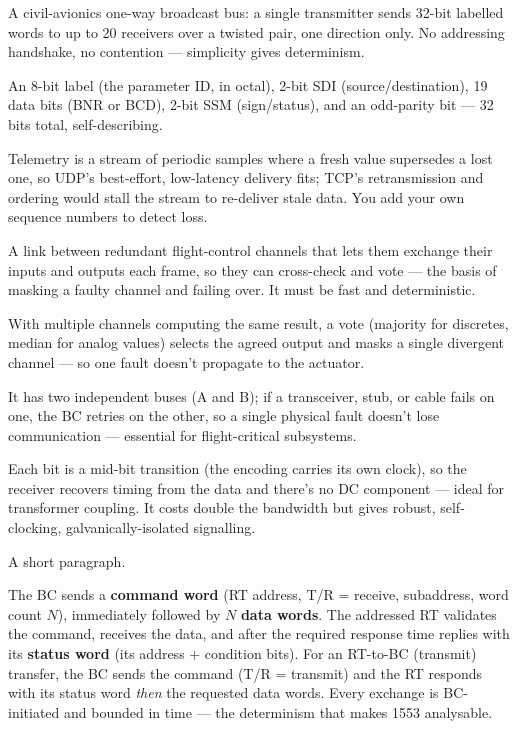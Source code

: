 A civil-avionics one-way broadcast bus: a single transmitter sends 32-bit
labelled words to up to 20 receivers over a twisted pair, one direction only.
No addressing handshake, no contention --- simplicity gives determinism.

An 8-bit label (the parameter ID, in octal), 2-bit SDI (source/destination),
19 data bits (BNR or BCD), 2-bit SSM (sign/status), and an odd-parity bit ---
32 bits total, self-describing.

Telemetry is a stream of periodic samples where a fresh value supersedes a lost
one, so UDP's best-effort, low-latency delivery fits; TCP's retransmission and
ordering would stall the stream to re-deliver stale data. You add your own
sequence numbers to detect loss.

A link between redundant flight-control channels that lets them exchange their
inputs and outputs each frame, so they can cross-check and vote --- the basis of
masking a faulty channel and failing over. It must be fast and deterministic.

With multiple channels computing the same result, a vote (majority for
discretes, median for analog values) selects the agreed output and masks a
single divergent channel --- so one fault doesn't propagate to the actuator.

It has two independent buses (A and B); if a transceiver, stub, or cable fails
on one, the BC retries on the other, so a single physical fault doesn't lose
communication --- essential for flight-critical subsystems.

Each bit is a mid-bit transition (the encoding carries its own clock), so the
receiver recovers timing from the data and there's no DC component --- ideal for
transformer coupling. It costs double the bandwidth but gives robust,
self-clocking, galvanically-isolated signalling.

%
{A short paragraph.}

The BC sends a \textbf{command word} (RT address, T/R = receive, subaddress,
word count $N$), immediately followed by $N$ \textbf{data words}. The addressed
RT validates the command, receives the data, and after the required response
time replies with its \textbf{status word} (its address + condition bits). For
an RT-to-BC (transmit) transfer, the BC sends the command (T/R = transmit) and
the RT responds with its status word \emph{then} the requested data words. Every
exchange is BC-initiated and bounded in time --- the determinism that makes 1553
analysable.

